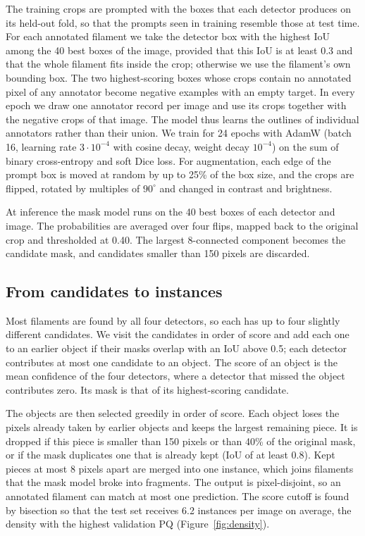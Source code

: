 \documentclass[sigconf,nonacm]{acmart}
\begin{document}
    The training crops are prompted with the boxes that each detector produces on its held-out fold, so that the prompts seen in training resemble those at test time. For each annotated filament we take the detector box with the highest IoU among the 40 best boxes of the image, provided that this IoU is at least 0.3 and that the whole filament fits inside the crop; otherwise we use the filament's own bounding box. The two highest-scoring boxes whose crops contain no annotated pixel of any annotator become negative examples with an empty target. In every epoch we draw one annotator record per image and use its crops together with the negative crops of that image. The model thus learns the outlines of individual annotators rather than their union. We train for 24 epochs with AdamW (batch 16, learning rate $3\cdot10^{-4}$ with cosine decay, weight decay $10^{-4}$) on the sum of binary cross-entropy and soft Dice loss. For augmentation, each edge of the prompt box is moved at random by up to 25\% of the box size, and the crops are flipped, rotated by multiples of $90^\circ$ and changed in contrast and brightness.

    At inference the mask model runs on the 40 best boxes of each detector and image. The probabilities are averaged over four flips, mapped back to the original crop and thresholded at 0.40. The largest 8-connected component becomes the candidate mask, and candidates smaller than 150 pixels are discarded.

\subsection{From candidates to instances}\label{sec:instances}
    Most filaments are found by all four detectors, so each has up to four slightly different candidates. We visit the candidates in order of score and add each one to an earlier object if their masks overlap with an IoU above 0.5; each detector contributes at most one candidate to an object. The score of an object is the mean confidence of the four detectors, where a detector that missed the object contributes zero. Its mask is that of its highest-scoring candidate.

    The objects are then selected greedily in order of score. Each object loses the pixels already taken by earlier objects and keeps the largest remaining piece. It is dropped if this piece is smaller than 150 pixels or than 40\% of the original mask, or if the mask duplicates one that is already kept (IoU of at least 0.8). Kept pieces at most 8 pixels apart are merged into one instance, which joins filaments that the mask model broke into fragments. The output is pixel-disjoint, so an annotated filament can match at most one prediction. The score cutoff is found by bisection so that the test set receives 6.2 instances per image on average, the density with the highest validation PQ (Figure~\ref{fig:density}).
\end{document}
